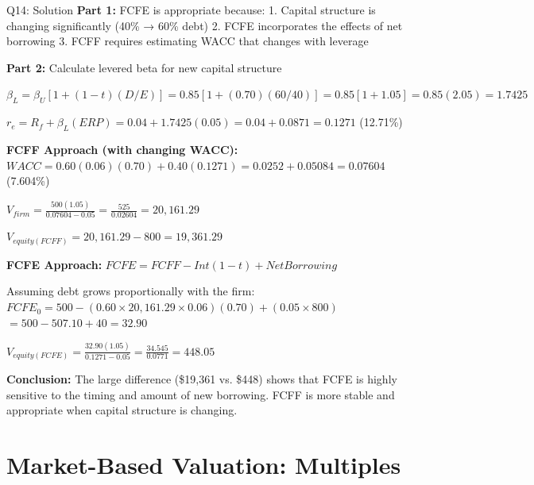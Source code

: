 \documentclass{beamer}
\renewcommand{\scriptsize}{\fontsize{6pt}{7pt}\selectfont}
\begin{document}
	\begin{frame}{Q14: Solution}
		\scriptsize
		\textbf{Part 1:} FCFE is appropriate because:
		1. Capital structure is changing significantly (40\% → 60\% debt)
		2. FCFE incorporates the effects of net borrowing
		3. FCFF requires estimating WACC that changes with leverage
		
		\vspace{2pt}
		\textbf{Part 2:} Calculate levered beta for new capital structure
		
		$\beta_L = \beta_U[1 + (1-t)(D/E)] = 0.85[1 + (0.70)(60/40)] = 0.85[1 + 1.05] = 0.85(2.05) = 1.7425$
		
		$r_e = R_f + \beta_L(ERP) = 0.04 + 1.7425(0.05) = 0.04 + 0.0871 = 0.1271$ (12.71\%)
		
		\vspace{2pt}
		\textbf{FCFF Approach (with changing WACC):}
		$WACC = 0.60(0.06)(0.70) + 0.40(0.1271) = 0.0252 + 0.05084 = 0.07604$ (7.604\%)
		
		$V_{firm} = \frac{500(1.05)}{0.07604 - 0.05} = \frac{525}{0.02604} = 20,161.29$
		
		$V_{equity(FCFF)} = 20,161.29 - 800 = 19,361.29$
		
		\vspace{2pt}
		\textbf{FCFE Approach:}
		$FCFE = FCFF - Int(1-t) + Net Borrowing$
		
		Assuming debt grows proportionally with the firm:
		$FCFE_0 = 500 - (0.60 \times 20,161.29 \times 0.06)(0.70) + (0.05 \times 800)$
		$= 500 - 507.10 + 40 = 32.90$
		
		$V_{equity(FCFE)} = \frac{32.90(1.05)}{0.1271 - 0.05} = \frac{34.545}{0.0771} = 448.05$
		
		\vspace{2pt}
		\textbf{Conclusion:} The large difference (\$19,361 vs. \$448) shows that FCFE is highly sensitive to the timing and amount of new borrowing. FCFF is more stable and appropriate when capital structure is changing.
	\end{frame}
	
	
	\section{Market-Based Valuation: Multiples}
	
\end{document}

